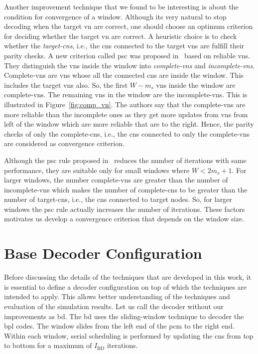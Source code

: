 Another improvement technique that we found to be interesting is about the condition for convergence of a window. Although its very natural to stop decoding when the target \gls{vn} are correct, one should choose an optimum criterion for deciding whether the target \gls{vn} are correct. A heuristic choice is to check whether the \emph{target-\glspl{cn}}, i.e., the \glspl{cn} connected to the target \glspl{vn} are fulfill their parity checks. A new criterion called \gls{psc} was proposed in~\cite{Kang2018} based on reliable \glspl{vn}. They distinguish the \glspl{vn} inside the window into \emph{complete-\glspl{vn}} and \emph{incomplete-\glspl{vn}}. Complete-\glspl{vn} are \glspl{vn} whose all the connected \glspl{cn} are inside the window. This includes the target \glspl{vn} also. So, the first $W-m_s$ \glspl{vn} inside the window are complete-\glspl{vn}. The remaining \glspl{vn} in the window are the incomplete-\glspl{vn}. This is illustrated in Figure~\ref{fig:comp_vn}. The authors say that the complete-\glspl{vn} are more reliable than the incomplete ones as they get more updates from \glspl{vn} from left of the window which are more reliable that are to the right. Hence, the parity checks of only the complete-\glspl{cn}, i.e., the \glspl{cn} connected to only the complete-\glspl{vn} are considered as convergence criterion.

Although the \gls{psc} rule proposed in~\cite{Kang2018} reduces the number of iterations with same performance, they are suitable only for small windows where $W<2m_s+1$. For larger windows, the number complete-\glspl{vn} are greater than the number of incomplete-\glspl{vn} which makes the number of complete-\glspl{cn} to be greater than the number of target-\glspl{cn}, i.e., the \glspl{cn} connected to target nodes. So, for larger windows the \gls{psc} rule actually increases the number of iterations. These factors motivates us develop a convergence criterion that depends on the window size.

\section{Base Decoder Configuration}
Before discussing the details of the techniques that are developed in this work, it is essential to define a decoder configuration on top of which the techniques are intended to apply. This allows better understanding of the techniques and evaluation of the simulation results. Let us call the decoder without our improvements as \gls{bd}. The \gls{bd} uses the sliding-window technique to decoder the \gls{bpl} codes. The window slides from the left end of the \gls{pcm} to the right end. Within each window, serial scheduling is performed by updating the \glspl{cn} from top to bottom for a maximum of $I_{\text{BD}}$ iterations.

